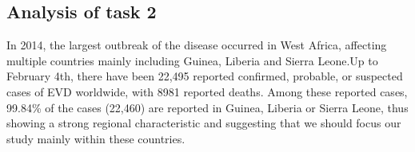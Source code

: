 %   
%  
%  
%  

\subsection{Analysis of task 2}

\par In 2014, the largest outbreak of the disease occurred in West Africa, affecting multiple countries mainly including Guinea, Liberia and Sierra Leone.\cite{CDC}Up to February 4th, there have been 22,495 reported confirmed, probable, or suspected cases of EVD worldwide, with 8981 reported deaths. Among these reported cases, 99.84\% of the cases (22,460) are reported in Guinea, Liberia or Sierra Leone, thus showing a strong regional characteristic and suggesting that we should focus our study mainly within these countries.

